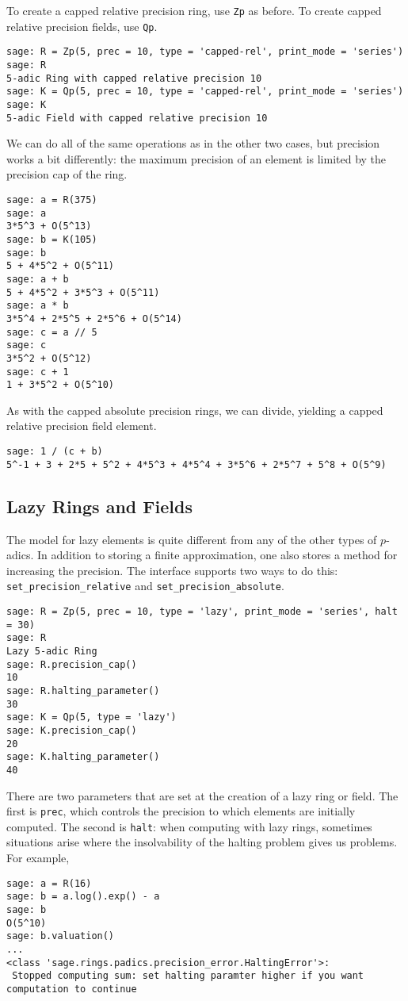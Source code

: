 \documentclass[12pt]{article}
\begin{document}
To create a capped relative precision ring, use \verb/Zp/ as before.  To create capped relative precision fields, use
\verb/Qp/.
\begin{verbatim}
sage: R = Zp(5, prec = 10, type = 'capped-rel', print_mode = 'series')
sage: R
5-adic Ring with capped relative precision 10
sage: K = Qp(5, prec = 10, type = 'capped-rel', print_mode = 'series')
sage: K
5-adic Field with capped relative precision 10
\end{verbatim}

We can do all of the same operations as in the other two cases, but precision works a bit differently:
the maximum precision of an element is limited by the precision cap of the ring.
\begin{verbatim}
sage: a = R(375)
sage: a
3*5^3 + O(5^13)
sage: b = K(105)
sage: b
5 + 4*5^2 + O(5^11)
sage: a + b
5 + 4*5^2 + 3*5^3 + O(5^11)
sage: a * b
3*5^4 + 2*5^5 + 2*5^6 + O(5^14)
sage: c = a // 5
sage: c
3*5^2 + O(5^12)
sage: c + 1
1 + 3*5^2 + O(5^10)
\end{verbatim}

As with the capped absolute precision rings, we can divide, yielding a capped relative precision field element.
\begin{verbatim}
sage: 1 / (c + b)
5^-1 + 3 + 2*5 + 5^2 + 4*5^3 + 4*5^4 + 3*5^6 + 2*5^7 + 5^8 + O(5^9)
\end{verbatim}

\subsection{Lazy Rings and Fields}
The model for lazy elements is quite different from any of the other types of $p$-adics.
In addition to storing a finite approximation, one also stores a method for increasing
the precision.  The interface supports two ways to do this: \verb/set_precision_relative/ and
\verb/set_precision_absolute/.

\begin{verbatim}
sage: R = Zp(5, prec = 10, type = 'lazy', print_mode = 'series', halt = 30)
sage: R
Lazy 5-adic Ring
sage: R.precision_cap()
10
sage: R.halting_parameter()
30
sage: K = Qp(5, type = 'lazy')
sage: K.precision_cap()
20
sage: K.halting_parameter()
40
\end{verbatim}

There are two parameters that are set at the creation of a lazy ring or field.  The first is \verb/prec/, which
controls the precision to which elements are initially computed.  The second is \verb/halt/: when computing with lazy rings, sometimes situations
arise where the insolvability of the halting problem gives us problems.  For example,
\begin{verbatim}
sage: a = R(16)
sage: b = a.log().exp() - a
sage: b
O(5^10)
sage: b.valuation()
...
<class 'sage.rings.padics.precision_error.HaltingError'>:
 Stopped computing sum: set halting paramter higher if you want computation to continue
\end{verbatim}
\end{document}
